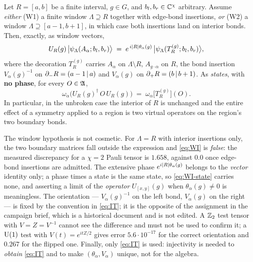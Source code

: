 \begin{theorem}
\label{thm:wi}
\statusProved\;
Let $R=[a,b]$ be a finite interval, $g\in G$, and $b_l,b_r\in\mathbb{C}^\chi$ arbitrary.
Assume \emph{either} (W1) a finite window $\Lambda\supseteq R$ together with edge-bond
insertions, \emph{or} (W2) a window $\Lambda\supseteq[a-1,b+1]$, in which case
both insertions land on interior bonds.  Then, exactly, as window vectors,
\begin{equation}
  U_R(g)\,\bigl|\psi_\Lambda(A_\alpha;b_l,b_r)\bigr\rangle
  \;=\; e^{\,i\lvert R\rvert\theta_\alpha(g)}\,
        \bigl|\psi_\Lambda(T_R^{(g)};b_l,b_r)\bigr\rangle,
  \label{eq:WI}
\end{equation}
where the decoration $T_R^{(g)}$ carries $A_\alpha$ on $\Lambda\setminus R$,
$A_{g\cdot\alpha}$ on $R$, the bond insertion $V_\alpha(g)^{-1}$ on
$\partial_-R=(a-1\,|\,a)$ and $V_\alpha(g)$ on $\partial_+R=(b\,|\,b+1)$.
As \emph{states}, with \textbf{no phase}, for every $O\in\mathfrak{A}$,
\begin{equation}
  \omega_\alpha\bigl(U_R(g)^\dagger\,O\,U_R(g)\bigr)
  \;=\; \omega_\alpha\bigl[T_R^{(g)}\bigr](O).
  \label{eq:WI-state}
\end{equation}
In particular, in the unbroken case the interior of $R$ is unchanged and the
entire effect of a symmetry applied to a region is two virtual operators on the
region's two boundary bonds.
\end{theorem}

\begin{scope}
The window hypothesis is not cosmetic.  For $\Lambda=R$ with interior insertions
only, the two boundary matrices fall outside the expression and \cref{eq:WI} is
\emph{false}: the measured discrepancy for a $\chi=2$ Pauli tensor is $1.658$,
against $0.0$ once edge-bond insertions are admitted.  The extensive phase
$e^{i\lvert R\rvert\theta_\alpha(g)}$ belongs to the \emph{vector} identity only; a
phase times a state is the same state, so \cref{eq:WI-state} carries none, and
asserting a limit of the \emph{operator} $U_{[x,y]}(g)$ when
$\theta_\alpha(g)\neq0$ is meaningless.  The orientation --- $V_\alpha(g)^{-1}$
on the left bond, $V_\alpha(g)$ on the right --- is fixed by the convention in
\cref{eq:IT}; it is the opposite of the assignment in the campaign brief, which
is a historical document and is not edited.  A $\mathbb{Z}_2$ test tensor with
$V=Z=V^{-1}$ cannot see the difference and must not be used to confirm it; a
$\operatorname{U}(1)$ test with $V(t)=e^{itZ/2}$ gives error $5.6\cdot10^{-17}$ for the
correct orientation and $0.267$ for the flipped one.  Finally, only
\cref{eq:IT} is used: injectivity is needed to \emph{obtain} \cref{eq:IT} and to
make $(\theta_\alpha,V_\alpha)$ unique, not for the algebra.
\end{scope}

